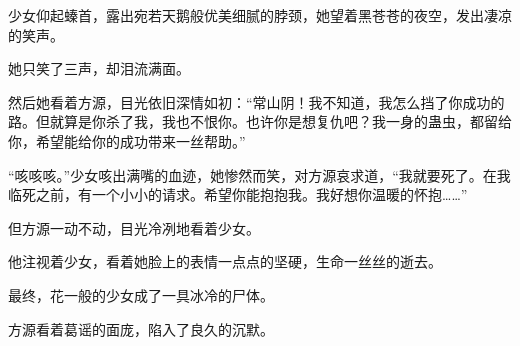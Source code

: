 \begin{this_body}
少女仰起螓首，露出宛若天鹅般优美细腻的脖颈，她望着黑苍苍的夜空，发出凄凉的笑声。

她只笑了三声，却泪流满面。

然后她看着方源，目光依旧深情如初：“常山阴！我不知道，我怎么挡了你成功的路。但就算是你杀了我，我也不恨你。也许你是想复仇吧？我一身的蛊虫，都留给你，希望能给你的成功带来一丝帮助。”

“咳咳咳。”少女咳出满嘴的血迹，她惨然而笑，对方源哀求道，“我就要死了。在我临死之前，有一个小小的请求。希望你能抱抱我。我好想你温暖的怀抱……”

但方源一动不动，目光冷冽地看着少女。

他注视着少女，看着她脸上的表情一点点的坚硬，生命一丝丝的逝去。

最终，花一般的少女成了一具冰冷的尸体。

方源看着葛谣的面庞，陷入了良久的沉默。

\end{this_body}

